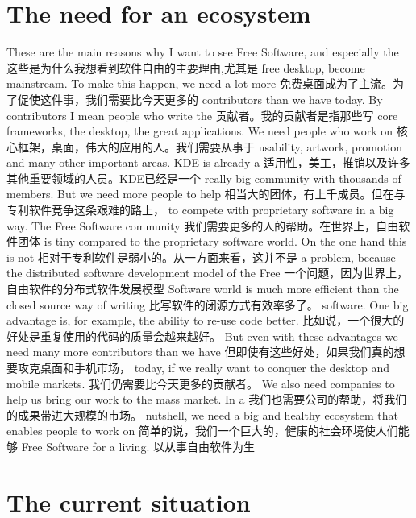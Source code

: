 ﻿\section*{The need for an ecosystem}
These are the main reasons why I want to see Free Software, and especially the
这些是为什么我想看到软件自由的主要理由,尤其是
free desktop, become mainstream. To make this happen, we need a lot more
免费桌面成为了主流。为了促使这件事，我们需要比今天更多的
contributors than we have today. By contributors I mean people who write the
贡献者。我的贡献者是指那些写
core frameworks, the desktop, the great applications. We need people who work on
核心框架，桌面，伟大的应用的人。我们需要从事于
usability, artwork, promotion and many other important areas. KDE is already a
适用性，美工，推销以及许多其他重要领域的人员。KDE已经是一个
really big community with thousands of members. But we need more people to help 
相当大的团体，有上千成员。但在与专利软件竞争这条艰难的路上，
to compete with proprietary software in a big way. The Free Software community
我们需要更多的人的帮助。在世界上，自由软件团体
is tiny compared to the proprietary software world. On the one hand this is not
相对于专利软件是弱小的。从一方面来看，这并不是
a problem, because the distributed software development model of the Free
一个问题，因为世界上，自由软件的分布式软件发展模型
Software world is much more efficient than the closed source way of writing
比写软件的闭源方式有效率多了。
software. One big advantage is, for example, the ability to re-use code better.
比如说，一个很大的好处是重复使用的代码的质量会越来越好。
But even with these advantages we need many more contributors than we have
但即使有这些好处，如果我们真的想要攻克桌面和手机市场，
today, if we really want to conquer the desktop and mobile markets.
我们仍需要比今天更多的贡献者。
We also need companies to help us bring our work to the mass market. In a
我们也需要公司的帮助，将我们的成果带进大规模的市场。
nutshell, we need a big and healthy ecosystem that enables people to work on
简单的说，我们一个巨大的，健康的社会环境使人们能够
Free Software for a living.
以从事自由软件为生
\section*{The current situation}
